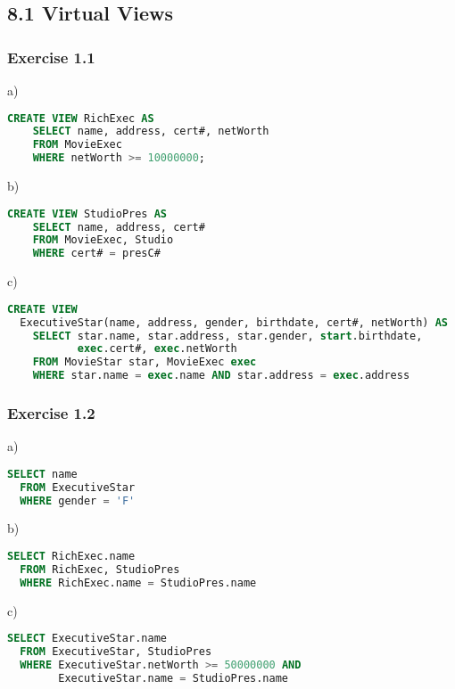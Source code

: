 \documentclass[../../main.tex]{subfiles}
\begin{document}
\subsection*{8.1 Virtual Views}

\subsubsection*{Exercise 1.1}

a)

\begin{lstlisting}[language=sql]
  CREATE VIEW RichExec AS
    SELECT name, address, cert#, netWorth
    FROM MovieExec
    WHERE netWorth >= 10000000;
\end{lstlisting}

b)

\begin{lstlisting}[language=sql]
  CREATE VIEW StudioPres AS
    SELECT name, address, cert#
    FROM MovieExec, Studio
    WHERE cert# = presC#
\end{lstlisting}

c)

\begin{lstlisting}[language=sql]
  CREATE VIEW
  ExecutiveStar(name, address, gender, birthdate, cert#, netWorth) AS
    SELECT star.name, star.address, star.gender, start.birthdate,
           exec.cert#, exec.netWorth
    FROM MovieStar star, MovieExec exec
    WHERE star.name = exec.name AND star.address = exec.address
\end{lstlisting}

\subsubsection*{Exercise 1.2}

a)

\begin{lstlisting}[language=sql]
  SELECT name
  FROM ExecutiveStar
  WHERE gender = 'F'
\end{lstlisting}

b)

\begin{lstlisting}[language=sql]
  SELECT RichExec.name
  FROM RichExec, StudioPres
  WHERE RichExec.name = StudioPres.name
\end{lstlisting}

c)

\begin{lstlisting}[language=sql]
  SELECT ExecutiveStar.name
  FROM ExecutiveStar, StudioPres
  WHERE ExecutiveStar.netWorth >= 50000000 AND
        ExecutiveStar.name = StudioPres.name
\end{lstlisting}
\end{document}
